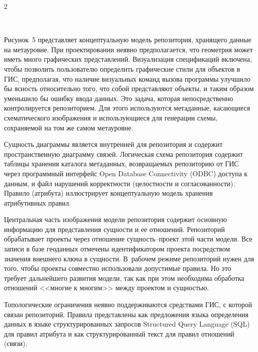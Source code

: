 \begin{multicols}{2}
\begin{figure} %
 \vspace*{1pt}
 \begin{center}
 \mbox{%
 \epsfxsize=127.755mm
 }
 \end{center}
 \vspace*{-9pt}
\vspace*{6pt}
\end{figure}

      Рисунок~5 представляет концептуальную модель репозитория, хранящего 
данные на ме\-та\-уров\-не. 
При проектировании неявно предполагается, что геометрия может 
иметь много {графических} представлений. Визуализация спецификаций вклю\-че\-на, чтобы 
позволить пользователю определить графические стили для объектов в ГИС, предполагая, 
что наличие визуальных команд вызова программы улучшило бы ясность относительно 
того, что собой представляют объекты, и таким образом уменьшило бы ошибку ввода 
данных. Это задача, которая непосредственно контролируется репозиторием. Для этого 
используются метаданные, касающиеся схематического изображения и использующиеся 
для генерации схемы, со\-хра\-ня\-емой на том же самом метауровне.
      
      Сущность диаграммы является внутренней для репозитория и содержит 
пространственную диаграмму связей. Логическая схема репозитория содержит таблицы 
хранения каталога метаданных, возвращаемых репозиторию от ГИС через программный 
интерфейс Open Database Connectivity (ODBC) доступа к данным, и файл нарушений 
корректности (целостности и согласованности). Правило (атрибута) иллюстрирует 
концептуальную модель хранения атрибутивных правил. 



      Центральная часть изображения модели репозитория содержит основную 
информацию для представления сущности и ее отношений. Репозиторий обрабатывает 
проекты через отношение сущность--проект этой части модели. Все записи в базе 
геоданных отмечены идентификатором проекта посредством значения внешнего ключа в 
сущности. В~рабочем режиме репозиторий нужен для того, чтобы 
проекты совместно использовали допустимые правила. Но это требует дальнейшего 
развития модели, так как при этом необходима обработка отношений <<многие к многим>> 
между проектом и сущностью. 
      
      Топологические ограничения неявно поддерживаются средствами ГИС, с которой 
связан репозиторий. Правила представлены как предложения языка определения данных в 
языке структурированных запросов Structured Query Language (SQL) для правил атрибута 
и как структурированный текст для правил отношений (связи).



\end{multicols}
